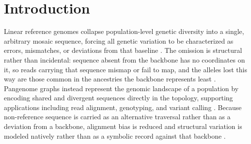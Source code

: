 %
%

\section{Introduction}

Linear reference genomes collapse population-level genetic diversity into a single,
arbitrary mosaic sequence, forcing all genetic variation to be characterized as
errors, mismatches, or deviations from that baseline \cite{schneider2017}. The
omission is structural rather than incidental: sequence absent from the backbone has
no coordinates on it, so reads carrying that sequence mismap or fail to map, and the
alleles lost this way are those common in the ancestries the backbone represents
least \cite{ballouz2019}. Pangenome graphs instead represent the genomic landscape of
a population by encoding shared and divergent sequences directly in the topology,
supporting applications including read alignment, genotyping, and variant calling
\cite{eizenga2020,siren2021,ebler2022}. Because non-reference sequence is carried as
an alternative traversal rather than as a deviation from a backbone, alignment bias
is reduced \cite{siren2021} and structural variation is modeled natively rather than
as a symbolic record against that backbone \cite{hickey2024}.

